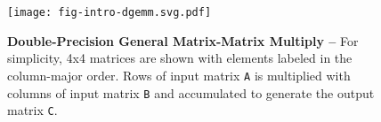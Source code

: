 
\begin{figure}[h]

  \centering
  \texttt{[image: fig-intro-dgemm.svg.pdf]}

  \caption{\textbf{Double-Precision General Matrix-Matrix Multiply --}
    For simplicity, 4x4 matrices are shown with elements labeled in the
    column-major order. Rows of input matrix {\tt{A}} is multiplied with
    columns of input matrix {\tt{B}} and accumulated to generate the
    output matrix {\tt{C}}.}

  \label{fig-intro-dgemm}

\end{figure}

